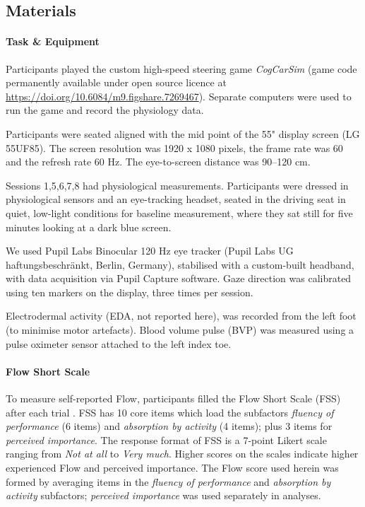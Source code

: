 \documentclass[10pt,letterpaper,floatsintext]{article}
\begin{document}
\subsection*{Materials}
\paragraph{Task \& Equipment} Participants played the custom high-speed steering game {\it CogCarSim} (game code permanently available under open source licence at \url{https://doi.org/10.6084/m9.figshare.7269467}). Separate computers were used to run the game and record the physiology data.

Participants were seated aligned with the mid point of the 55" display screen (LG 55UF85). The screen resolution was 1920 x 1080 pixels, the frame rate was 60 and the refresh rate 60 Hz. The eye-to-screen distance was 90--120 cm.

Sessions 1,5,6,7,8 had physiological measurements. Participants were dressed in physiological sensors and an eye-tracking headset, seated in the driving seat in quiet, low-light conditions for baseline measurement, where they sat still for five minutes looking at a dark blue screen.

We used Pupil Labs Binocular 120 Hz eye tracker (Pupil Labs UG haftungsbeschränkt, Berlin, Germany), stabilised with a custom-built headband, with data acquisition via Pupil Capture software. Gaze direction was calibrated using ten markers on the display, three times per session.

Electrodermal activity (EDA, not reported here),  was recorded from the left foot (to minimise motor artefacts). Blood volume pulse (BVP) was measured using a pulse oximeter sensor attached to the left index toe.

\paragraph{Flow Short Scale} To measure self-reported Flow, participants filled the Flow Short Scale (FSS) after each trial \cite{Rheinberg2003,Engeser2008}. FSS has 10 core items which load the subfactors {\it fluency of performance} (6 items) and {\it absorption by activity} (4 items); plus 3 items for {\it perceived importance}. The response format of FSS is a 7-point Likert scale ranging from {\it Not at all} to {\it Very much}. Higher scores on the scales indicate higher experienced Flow and perceived importance. The Flow score used herein was formed by averaging items in the {\it fluency of performance} and {\it absorption by activity} subfactors; {\it perceived importance} was used separately in analyses. 
\end{document}
